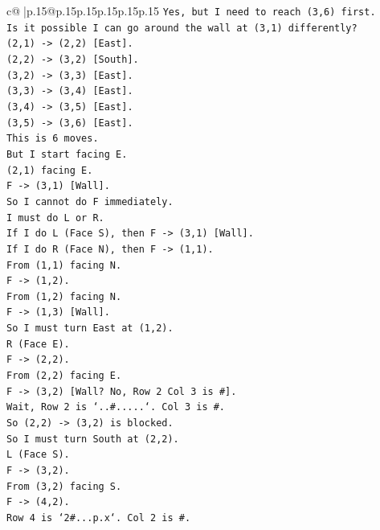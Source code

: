 \documentclass{article}
\begin{document}
{\begin{supertabular}{c@{$\;$}|p{.15\linewidth}@{}p{.15\linewidth}p{.15\linewidth}p{.15\linewidth}p{.15\linewidth}p{.15\linewidth}}
{{{\texttt{Yes, but I need to reach (3,6) first.} \\
\texttt{Is it possible I can go around the wall at (3,1) differently?} \\
\texttt{(2,1) {-}> (2,2) {[}East{]}.} \\
\texttt{(2,2) {-}> (3,2) {[}South{]}.} \\
\texttt{(3,2) {-}> (3,3) {[}East{]}.} \\
\texttt{(3,3) {-}> (3,4) {[}East{]}.} \\
\texttt{(3,4) {-}> (3,5) {[}East{]}.} \\
\texttt{(3,5) {-}> (3,6) {[}East{]}.} \\
\texttt{This is 6 moves.} \\
\texttt{But I start facing E.} \\
\texttt{(2,1) facing E.} \\
\texttt{F {-}> (3,1) {[}Wall{]}.} \\
\texttt{So I cannot do F immediately.} \\
\texttt{I must do L or R.} \\
\texttt{If I do L (Face S), then F {-}> (3,1) {[}Wall{]}.} \\
\texttt{If I do R (Face N), then F {-}> (1,1).} \\
\texttt{From (1,1) facing N.} \\
\texttt{F {-}> (1,2).} \\
\texttt{From (1,2) facing N.} \\
\texttt{F {-}> (1,3) {[}Wall{]}.} \\
\texttt{So I must turn East at (1,2).} \\
\texttt{R (Face E).} \\
\texttt{F {-}> (2,2).} \\
\texttt{From (2,2) facing E.} \\
\texttt{F {-}> (3,2) {[}Wall? No, Row 2 Col 3 is \#{]}.} \\
\texttt{Wait, Row 2 is `..\#.....`. Col 3 is \#.} \\
\texttt{So (2,2) {-}> (3,2) is blocked.} \\
\texttt{So I must turn South at (2,2).} \\
\texttt{L (Face S).} \\
\texttt{F {-}> (3,2).} \\
\texttt{From (3,2) facing S.} \\
\texttt{F {-}> (4,2).} \\
\texttt{Row 4 is `2\#...p.x`. Col 2 is \#.} \\
}}}
\end{supertabular}}
\end{document}

